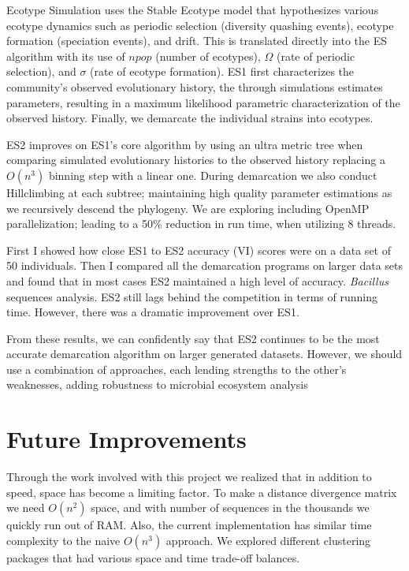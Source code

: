 Ecotype Simulation uses the Stable Ecotype model that hypothesizes various ecotype dynamics such as periodic selection (diversity quashing events), ecotype formation (speciation events), and drift.
This is translated directly into the ES algorithm with its use of $npop$ (number of ecotypes), $\Omega$ (rate of periodic selection), and $\sigma$ (rate of ecotype formation).
ES1 first characterizes the community's observed evolutionary history, the through simulations estimates parameters, resulting in a maximum likelihood parametric characterization of the observed history.
Finally, we demarcate the individual strains into ecotypes.

ES2 improves on ES1's core algorithm by using an ultra metric tree when comparing simulated evolutionary histories to the observed history replacing a $O(n^3)$ binning step with a linear one.
During demarcation we also conduct Hillclimbing at each subtree; maintaining high quality parameter estimations as we recursively descend the phylogeny.
We are exploring including OpenMP parallelization; leading to a 50\% reduction in run time, when utilizing 8 threads.

First I showed how close ES1 to ES2 accuracy (VI) scores were on a data set of 50 individuals.
Then I compared all the demarcation programs on larger data sets and found that in most cases ES2 maintained a high level of accuracy.
\emph{Bacillus} sequences analysis.
ES2 still lags behind the competition in terms of running time.
However, there was a dramatic improvement over ES1.

From these results, we can confidently say that ES2 continues to be the most accurate demarcation algorithm on larger generated datasets. However, we should use a combination of approaches, each lending strengths to the other's weaknesses, adding robustness to microbial ecosystem analysis~\cite{bohannan2003new}






\section{Future Improvements}
Through the work involved with this project we realized that in addition to speed, space has become a limiting factor.
To make a distance divergence matrix we need $O(n^2)$ space, and with number of sequences in the thousands we quickly run out of RAM. Also, the current implementation has similar time complexity to the naive $O(n^3)$ approach.
We explored different clustering packages that had various space and time trade-off balances.

